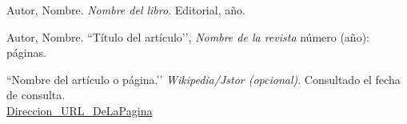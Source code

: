\documentclass[spanish,twoside]{book}
\begin{document}









\begin{thebibliography}{3}

Autor, Nombre.
\textit{Nombre del libro}.
Editorial, año. 

Autor, Nombre.
``Título del artículo’’,
\textit{Nombre de la revista} número (año):
páginas.

``Nombre del artículo o página.’’
\textit{Wikipedia/Jstor (opcional)}.
Consultado el fecha de consulta.\\
\url{Direccion\_URL\_DeLaPagina}

\end{thebibliography}











\end{document}
